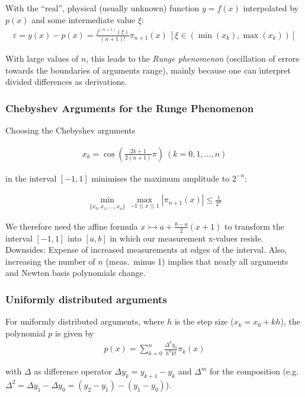 With the ``real'', physical (usually unknown) function $y=f(x)$ interpolated by $p(x)$ and some intermediate value $\xi$:
\begin{align*}
    \varepsilon = y(x)-p(x)=\frac{f^{(n+1)}(\xi)}{(n+1)!}\pi_{n+1}(x)\ \left[\xi\in \left(\min(x_k),\max(x_k)\right)\right]
\end{align*}

With large values of $n$, this leads to the \emph{Runge phenomenon} (oscillation of errors towards the boundaries of arguments range),
mainly because one can interpret divided differences as derivations.

\subsubsection{Chebyshev Arguments for the Runge Phenomenon}

Choosing the Chebyshev arguments

\begin{align*}
    x_k = \cos\left( \frac{2k+1}{2(n+1)}\pi \right)\ (k=0,1,\ldots,n)
\end{align*}

in the interval $[-1,1]$ minimises the maximum amplitude to $2^{-n}$:

\begin{align*}
    \min_{\{x_0,x_1,\ldots,x_n\}}\max_{-1\leq x \leq 1} \left|\pi_{n+1}(x)\right| \leq \frac{1}{2^n}
\end{align*}

We therefore need the affine formula $x\rightarrowtail a+\frac{b-a}{2}(x+1)$
to transform the interval $[-1,1]$ into $[a,b]$ in which our measurement x-values reside.
Downsides: Expense of increased measurements at edges of the interval.
Also, increasing the number of $n$ (meas.\ minus 1) implies that nearly all arguments and Newton basis polynomials change.

\subsubsection{Uniformly distributed arguments}

For uniformly distributed arguments, where $h$ is the step size ($x_k = x_0 + kh$),
the polynomial $p$ is given by
\begin{align*}
    p(x) = \sum_{k=0}^n \frac{\Delta^k y_0}{h^kk!}\pi_k(x)
\end{align*}

with $\Delta$ as difference operator $\Delta y_k=y_{k+1} - y_k$
and $\Delta^m$ for the composition (e.g. $\Delta^2 = \Delta y_1 - \Delta y_0 = (y_2-y_1) - (y_1-y_0)$).

